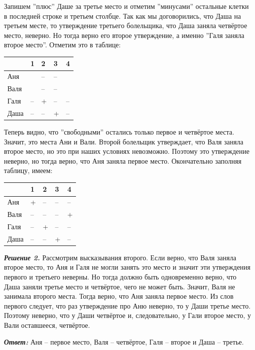 \begin{prf}
    Запишем ''плюс'' Даше за третье место и отметим ''минусами'' остальные клетки в последней строке и третьем столбце. Так как мы договорились, что Даша на третьем месте, то утверждение третьего болельщика, что Даша заняла четвёртое место, неверно. Но тогда верно его второе утверждение, а именно ''Галя заняла второе место''. Отметим это в таблице:
    
    \begin{center}
    \begin{tabular}{ | m{2cm} | m{2cm}| m{2cm} | m{2cm} | m{2cm} | } 
        \hline
        & 1 & 2 & 3 & 4 \\ 
        \hline
        Аня &  & -- & -- & \\ 
        \hline
        Валя &  & -- & -- &   \\ 
        \hline
        Галя & -- & + & -- & -- \\ 
        \hline
        Даша & -- & -- & + & -- \\ 
        \hline
    \end{tabular}
    \end{center}

    Теперь видно, что ''свободными'' остались только первое и четвёртое места. Значит, это места Ани и Вали. Второй болельщик утверждает, что Валя заняла второе место, но это при наших условиях невозможно. Поэтому это утверждение неверно, но тогда верно, что Аня заняла первое место. Окончательно заполняя таблицу, имеем:

    \begin{center}
    \begin{tabular}{ | m{2cm} | m{2cm}| m{2cm} | m{2cm} | m{2cm} | } 
        \hline
        & 1 & 2 & 3 & 4 \\ 
        \hline
        Аня & + & -- & -- & -- \\ 
        \hline
        Валя & -- & -- & -- & + \\ 
        \hline
        Галя & -- & + & -- & -- \\ 
        \hline
        Даша & -- & -- & + & -- \\ 
        \hline
    \end{tabular}
    \end{center}

    \par

    \textbf{\textit{Решение 2.}} Рассмотрим высказывания второго. Если верно, что Валя заняла второе место, то Аня и Галя не могли занять это место и значит эти утверждения первого и третьего неверны. Но тогда должно быть одновременно верно, что Даша заняли третье место и четвёртое, чего не может быть. Значит, Валя не занимала второго места. Тогда верно, что Аня заняла первое место. Из слов первого следует, что раз утверждение про Аню неверно, то у Даши третье место. Поэтому неверно, что у Даши четвёртое и, следовательно, у Гали второе место, у Вали оставшееся, четвёртое.

    \par

    \textbf{\textit{Ответ:}} Аня – первое место, Валя – четвёртое, Галя – второе и Даша – третье.
\end{prf}

